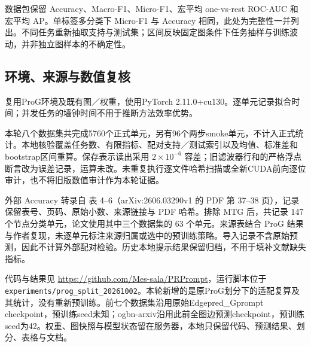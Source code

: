 数据包保留 Accuracy、Macro-F1、Micro-F1、宏平均 one-vs-rest ROC-AUC 和宏平均 AP。单标签多分类下 Micro-F1 与 Accuracy 相同，此处为完整性一并列出。不同任务重新抽取支持与测试集；区间反映固定图条件下任务抽样与训练波动，并非独立图样本的不确定性。

\subsection{环境、来源与数值复核}
复用ProG环境及既有图／权重，使用PyTorch 2.11.0+cu130。逐单元记录拟合时间；并发任务的墙钟时间不用于推断方法效率优势。

本轮八个数据集共完成5760个正式单元，另有96个两步smoke单元，不计入正式统计。本地核验覆盖任务数、有限指标、配对支持／测试索引以及均值、标准差和bootstrap区间重算。保存表示读出采用 $2\times10^{-6}$ 容差；旧滤波器行和的严格浮点断言改为误差记录，运算未改。未重复执行逐文件哈希扫描或全新CUDA前向逐位审计，也不将旧版数值审计作为本轮证据。

外部 Accuracy 转录自 \citet{mtg2026} 表 4--6（arXiv:2606.03290v1 的 PDF 第 37--38 页），记录保留表号、页码、原始小数、来源链接与 PDF 哈希。排除 MTG 后，共记录 147 个节点分类单元，论文使用其中三个数据集的 63 个单元。来源表结合 ProG 结果与作者复现，未逐单元标注来源归属或选中的预训练策略。导入记录不含原始预测，因此不计算外部配对检验。历史本地提示结果保留归档，不用于填补文献缺失指标。

代码与结果见 \url{https://github.com/Mes-sala/PRPrompt}，运行脚本位于 \texttt{experiments/prog\_split\_20261002}。本轮新增的是原ProG划分下的适配复算及其统计，没有重新预训练。前七个数据集沿用原始Edgepred\_Gprompt checkpoint，预训练seed未知；ogbn-arxiv沿用此前全图边预测checkpoint，预训练seed为42。权重、图快照与模型状态留在服务器，本地只保留代码、预测结果、划分、表格与文档。

\clearpage
{}
\clearpage
{}

